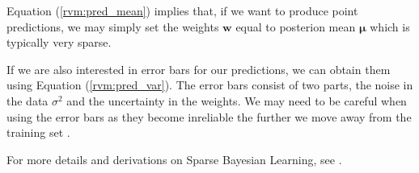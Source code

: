 Equation (\ref{rvm:pred_mean}) implies that, if we want to produce point predictions, we may simply set the weights $\bm w$ equal to posterion mean $\bm\mu$ which is typically very sparse.

If we are also interested in error bars for our predictions, we can obtain them using Equation (\ref{rvm:pred_var}).
The error bars consist of two parts, the noise in the data $\sigma^2$ and the uncertainty in the weights.
We may need to be careful when using the error bars as they become inreliable the further we move away from the training set \cite{rasmussen2005}. 

For more details and derivations on Sparse Bayesian Learning, see \cite{tipping2001,tipping2002,tipping2003}.

